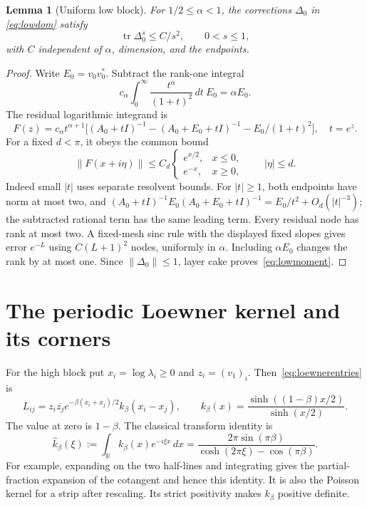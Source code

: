 \documentclass[11pt]{article}
\newtheorem{lemma}[theorem]{Lemma}
\numberwithin{equation}{section}
\newcommand{\tr}{\operatorname{tr}}
\newcommand{\R}{\mathbb R}
\begin{document}
\begin{lemma}[Uniform low block]\label{lem:low}
For $1/2\le\alpha<1$, the corrections $\Delta_0$ in
\eqref{eq:lowdom} satisfy
\begin{equation}\label{eq:lowmoment}
 \tr\Delta_0^s\le C/s^2,\qquad0<s\le1,
\end{equation}
with $C$ independent of $\alpha$, dimension, and the endpoints.
\end{lemma}
\begin{proof}
Write $E_0=v_0v_0^*$. Subtract the rank-one integral
\[
 c_\alpha\int_0^\infty\frac{t^\alpha}{(1+t)^2}\,dt\ E_0
 =\alpha E_0.
\]
The residual logarithmic integrand is
\[
 F(z)=c_\alpha t^{\alpha+1}
 \big[(A_0+tI)^{-1}-(A_0+E_0+tI)^{-1}-E_0/(1+t)^2\big],\quad t=e^z.
\]
For a fixed $d<\pi$, it obeys the common bound
\[
 \|F(x+i\eta)\|\le C_d
 \begin{cases}e^{x/2},&x\le0,\\ e^{-x},&x\ge0,\end{cases}
 \qquad |\eta|\le d.
\]
Indeed small $|t|$ uses separate resolvent bounds. For $|t|\ge1$,
both endpoints have norm at most two, and
$(A_0+tI)^{-1}E_0(A_0+E_0+tI)^{-1}=E_0/t^2+O_d(|t|^{-3})$;
the subtracted rational term has the same leading term.
Every residual node has rank at most two. A fixed-mesh sinc rule
with the displayed fixed slopes gives error $e^{-L}$ using
$C(L+1)^2$ nodes, uniformly in $\alpha$. Including $\alpha E_0$
changes the rank by at most one. Since $\|\Delta_0\|\le1$, layer
cake proves~\eqref{eq:lowmoment}.
\end{proof}

\section{The periodic Loewner kernel and its corners}

For the high block put $x_i=\log\lambda_i\ge0$ and $z_i=(v_1)_i$.
Then~\eqref{eq:loewnerentries} is
\begin{equation}\label{eq:kernel}
 L_{ij}=z_i\overline{z_j}e^{-\beta(x_i+x_j)/2}k_\beta(x_i-x_j),
 \qquad k_\beta(x)=\frac{\sinh((1-\beta)x/2)}{\sinh(x/2)}.
\end{equation}
The value at zero is $1-\beta$. The classical transform identity is
\begin{equation}\label{eq:transform}
 \widehat k_\beta(\xi):=\int_\R k_\beta(x)e^{-i\xi x}\,dx
       =\frac{2\pi\sin(\pi\beta)}{\cosh(2\pi\xi)-\cos(\pi\beta)}.
\end{equation}
For example, expanding on the two half-lines and integrating gives
the partial-fraction expansion of the cotangent and hence this
identity. It is also the Poisson kernel for a strip after rescaling.
Its strict positivity makes $k_\beta$ positive definite.
\end{document}
